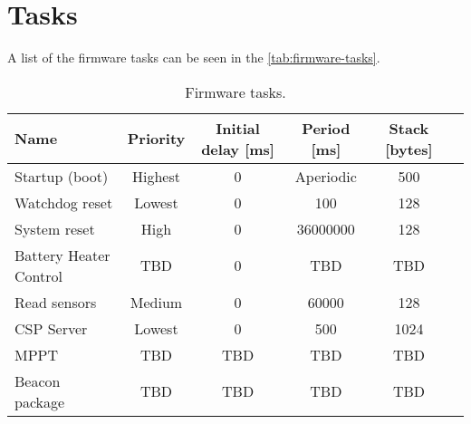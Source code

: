 \section{Tasks}

A list of the firmware tasks can be seen in the \autoref{tab:firmware-tasks}.

\begin{table}[!h]
    \centering
    \begin{tabular}{lccccc}
        \toprule[1.5pt]
        \textbf{Name}          & \textbf{Priority} & \textbf{Initial delay [ms]} & \textbf{Period [ms]} & \textbf{Stack [bytes]} \\
        \midrule
        Startup (boot)         & Highest           & 0                           & Aperiodic            & 500                    \\
        Watchdog reset         & Lowest            & 0                           & 100                  & 128                    \\
        System reset           & High              & 0                           & 36000000             & 128                    \\
        Battery Heater Control & TBD               & 0                           & TBD                  & TBD                    \\
        Read sensors           & Medium            & 0                           & 60000                & 128                    \\
        CSP Server             & Lowest            & 0                           & 500                  & 1024                   \\
        MPPT                   & TBD               & TBD                         & TBD                  & TBD                    \\
        Beacon package         & TBD               & TBD                         & TBD                  & TBD                    \\
        \bottomrule[1.5pt]
    \end{tabular}
    \caption{Firmware tasks.}
    \label{tab:firmware-tasks}
\end{table}

